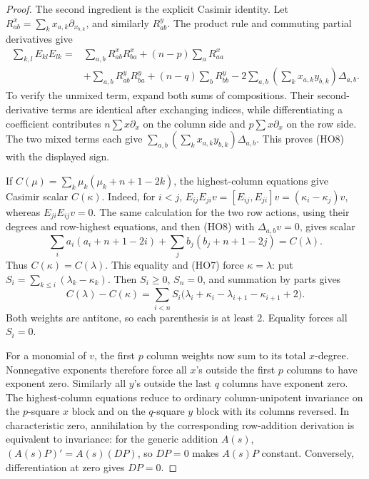 \begin{proof}
The second ingredient is the explicit Casimir identity.
Let \(R^x_{ab}=\sum_kx_{a,k}\partial_{x_{b,k}}\),
and similarly \(R^y_{ab}\).
The product rule and commuting partial derivatives give
\[
\begin{split}
 \sum_{k,l}E_{kl}E_{lk}
 ={}&\sum_{a,b}R^x_{ab}R^x_{ba}
           +(n-p)\sum_aR^x_{aa}\\
 &+\sum_{a,b}R^y_{ab}R^y_{ba}
           +(n-q)\sum_bR^y_{bb}
 -2\sum_{a,b}\left(\sum_kx_{a,k}y_{b,k}\right)\Delta_{a,b}.
\end{split}
 \tag{HO8}\label{eq:sr-source-capelli-casimir}
\]
To verify the unmixed term, expand both sums of compositions.
Their second-derivative terms are identical after exchanging
indices, while differentiating a coefficient contributes
\(n\sum x\partial_x\) on the column side and
\(p\sum x\partial_x\) on the row side.
The two mixed terms each give
\(\sum_{a,b}(\sum_kx_{a,k}y_{b,k})\Delta_{a,b}\).
This proves (HO8) with the displayed sign.

If \(C(\mu)=\sum_k\mu_k(\mu_k+n+1-2k)\), the highest-column
equations give Casimir scalar \(C(\kappa)\).
Indeed, for \(i<j\),
\(E_{ij}E_{ji}v=[E_{ij},E_{ji}]v
=(\kappa_i-\kappa_j)v\), whereas \(E_{ji}E_{ij}v=0\).
The same calculation for the two row actions, using their
degrees and row-highest equations, and then (HO8) with
\(\Delta_{a,b}v=0\), gives scalar
\[
 \sum_i a_i(a_i+n+1-2i)+
 \sum_j b_j(b_j+n+1-2j)=C(\lambda).
\]
Thus \(C(\kappa)=C(\lambda)\).
This equality and (HO7) force \(\kappa=\lambda\):
put \(S_i=\sum_{k\le i}(\lambda_k-\kappa_k)\).
Then \(S_i\ge0\), \(S_n=0\), and summation by parts gives
\[
 C(\lambda)-C(\kappa)
  =\sum_{i<n}S_i
    \bigl(\lambda_i+\kappa_i-\lambda_{i+1}-\kappa_{i+1}+2\bigr).
\]
Both weights are antitone, so each parenthesis is at least
\(2\).  Equality forces all \(S_i=0\).

For a monomial of \(v\), the first \(p\) column weights
now sum to its total \(x\)-degree.  Nonnegative exponents
therefore force all \(x\)'s outside the first \(p\) columns
to have exponent zero.  Similarly all \(y\)'s outside the
last \(q\) columns have exponent zero.
The highest-column equations reduce to ordinary
column-unipotent invariance on the \(p\)-square \(x\) block
and on the \(q\)-square \(y\) block with its columns
reversed.  In characteristic zero, annihilation by the
corresponding row-addition derivation is equivalent to
invariance: for the generic addition \(A(s)\),
\((A(s)P)'=A(s)(DP)\), so \(DP=0\) makes \(A(s)P\)
constant.  Conversely, differentiation at zero gives
\(DP=0\).


\end{proof}
